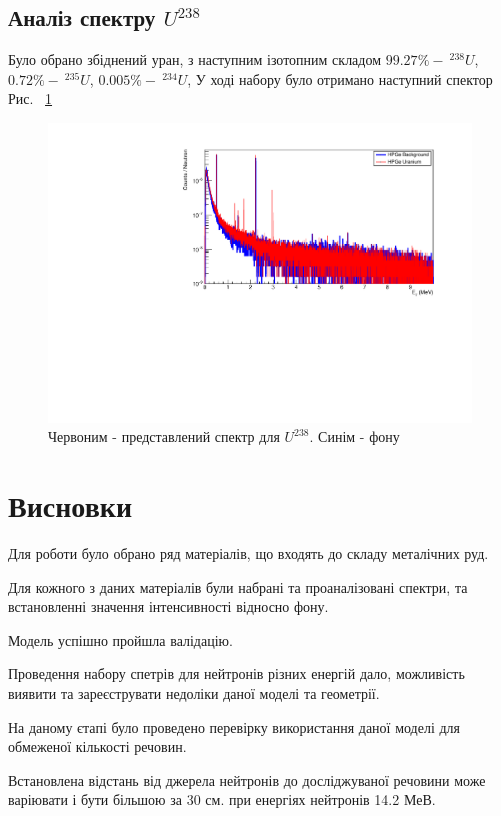 \documentclass[a4paper, 14pt]{article}
\numberwithin{equation}{section}
\numberwithin{table}{section}
\begin{document}
	\subsection{Аналіз спектру $U^{238}$}
	Було обрано збіднений уран, з наступним ізотопним складом $99.27\% -\  ^{238}U$, $ 0.72\% - \  ^{235}U$, $ 0.005\% - \ ^{234}U$, У ході набору було отримано наступний спектор Рис. ~\ref{ris:poorU}
	\begin{figure}[hbt!]
		\centering \includegraphics[width=1\textwidth]{res/poorUranium.pdf}
		\caption{Червоним - представлений спектр для $U^{238}$. Синім - фону} 
		\label{ris:poorU}	
	\end{figure} 	
	
	\newpage 
	\section{Висновки}
	\setcounter{figure}{0}
	Для роботи було обрано ряд матеріалів, що входять до складу металічних руд.
	
	Для кожного з даних матеріалів були набрані та проаналізовані спектри, та встановленні значення інтенсивності відносно фону. 
	
	Модель успішно пройшла валідацію.  
	
	Проведення набору спетрів для нейтронів різних енергій дало, можливість виявити та зареєструвати недоліки даної моделі та геометрії. 
	
	На даному єтапі було проведено перевірку використання даної моделі для обмеженої кількості речовин. 
	
	Встановлена відстань від джерела нейтронів до досліджуваної речовини може варіювати і бути більшою за 30 см. при енергіях нейтронів 14.2 МеВ.
	
\end{document}
